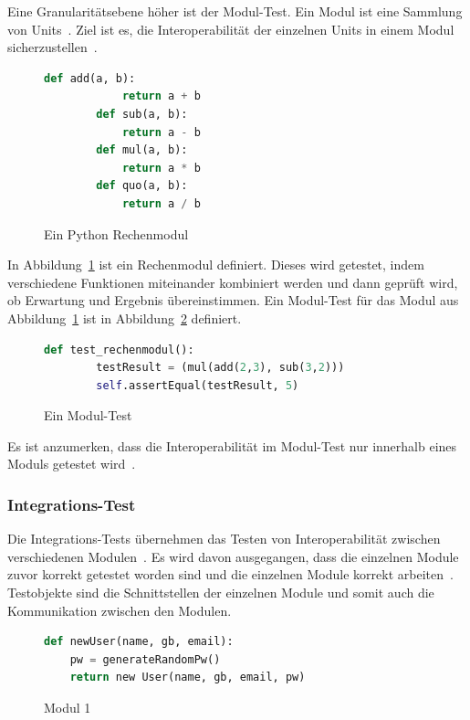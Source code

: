 Eine Granularitätsebene höher ist der Modul-Test.
Ein Modul ist eine Sammlung von Units~\cite[vgl. S. 6]{software-testing}.
Ziel ist es, die Interoperabilität der einzelnen Units in einem Modul sicherzustellen~\cite[vgl. S. 6]{software-testing}.

\begin{figure}[h!]
    \begin{lstlisting}[language=Python]
        def add(a, b):
            return a + b
        def sub(a, b):
            return a - b
        def mul(a, b):
            return a * b
        def quo(a, b):
            return a / b
    \end{lstlisting}
    \caption{Ein Python Rechenmodul}
    \label{modul}
\end{figure}

In Abbildung~\ref{modul} ist ein Rechenmodul definiert.
Dieses wird getestet, indem verschiedene Funktionen miteinander kombiniert werden und dann geprüft wird, ob Erwartung und Ergebnis übereinstimmen.
Ein Modul-Test für das Modul aus Abbildung~\ref{modul} ist in Abbildung~\ref{modultest} definiert.

\begin{figure}[h!]
    \begin{lstlisting}[language=Python]
    def test_rechenmodul():
        testResult = (mul(add(2,3), sub(3,2)))
        self.assertEqual(testResult, 5)
    \end{lstlisting}
    \caption{Ein Modul-Test}
    \label{modultest}
\end{figure}

Es ist anzumerken, dass die Interoperabilität im Modul-Test nur innerhalb eines Moduls getestet wird~\cite[vgl. S. 6]{software-testing}.

\subsubsection{Integrations-Test}

Die Integrations-Tests übernehmen das Testen von Interoperabilität zwischen verschiedenen Modulen~\cite[vgl. S. 7]{software-testing}.
Es wird davon ausgegangen, dass die einzelnen Module zuvor korrekt getestet worden sind und die einzelnen Module korrekt arbeiten~\cite[vgl. S. 7]{software-testing}.
Testobjekte sind die Schnittstellen der einzelnen Module und somit auch die Kommunikation zwischen den Modulen.

\begin{figure}[h!]
    \begin{lstlisting}[language=Python]
def newUser(name, gb, email):
    pw = generateRandomPw()
    return new User(name, gb, email, pw)
    \end{lstlisting}
    \caption{Modul 1}
    \label{modul1}
\end{figure}

